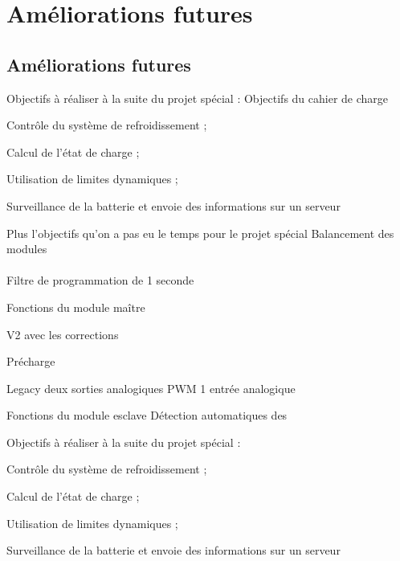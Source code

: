 \section{Améliorations futures}

	\subsection{Améliorations futures}
	

	Objectifs à réaliser à la suite du projet spécial :
	Objectifs du cahier de charge
		
	Contrôle du système de refroidissement ;
	
	Calcul de l’état de charge ;
	
	Utilisation de limites dynamiques ;
	
	Surveillance de la batterie et envoie des informations sur un serveur
	
	Plus l'objectifs qu'on a pas eu le temps pour le projet spécial Balancement des modules
	
	
		\paragraph{}
		
		Filtre de programmation de 1 seconde
		
		Fonctions du module maître
				
			V2 avec les corrections	
				
			Précharge
			
			Legacy
				deux sorties analogiques
				PWM
				1 entrée analogique
				
		Fonctions du module esclave
			Détection automatiques des				
				
		
		Objectifs à réaliser à la suite du projet spécial :
		
		Contrôle du système de refroidissement ;
		
		Calcul de l’état de charge ;
		
		Utilisation de limites dynamiques ;
		
		Surveillance de la batterie et envoie des informations sur un serveur
		